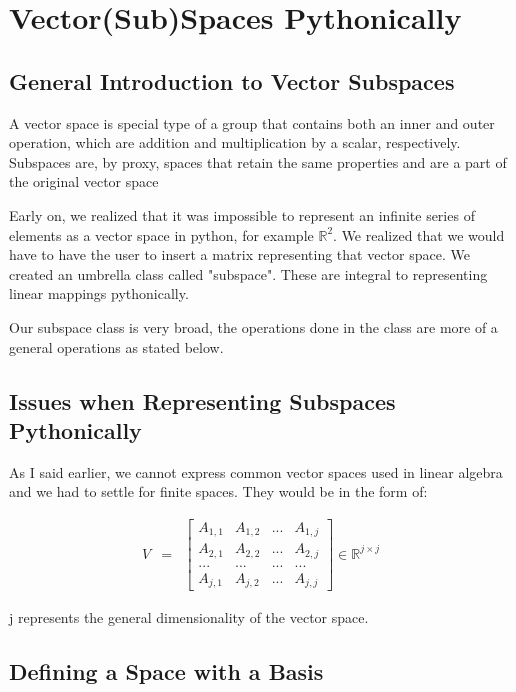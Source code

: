 \documentclass[12pt, a4paper]{article}
\begin{document}
\section{Vector(Sub)Spaces Pythonically}

\subsection{General Introduction to Vector Subspaces}

A vector space is special type of a group that contains both an inner and outer
operation, which are addition and multiplication by a scalar, respectively. Subspaces are, by proxy, spaces that retain the same properties and are a part of the original vector space

Early on, we realized that it was impossible to represent an infinite series of elements as a vector space in python, for example $\mathbb{R}^{2}$. 
We realized that we would have to have the user to insert a matrix representing that vector space. We created an umbrella class called "subspace".
These are integral to representing linear mappings pythonically.

Our subspace class is very broad, the operations done in the class are more of a general operations as stated below.

\subsection{Issues when Representing Subspaces Pythonically}

As I said earlier, we cannot express common vector spaces used in linear algebra and we had to settle for finite spaces. They would be in the form of:

\begin{eqnarray*}
    V & = &\begin{bmatrix}
        A_{1,1}  & A_{1,2} & ... & A_{1,j}\\
        A_{2,1} & A_{2,2} & ... & A_{2,j}\\
        ... & ... & ... & ... \\
        A_{j,1} & A_{j,2} & ... & A_{j,j}
    \end{bmatrix}
    \in \mathbb{R}^{j \times j}
\end{eqnarray*}

j represents the general dimensionality of the vector space. 

\subsection{Defining a Space with a Basis}
\end{document}

